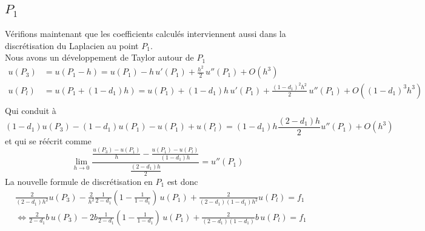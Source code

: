 \documentclass[11pt,a4paper]{article}
\begin{document}
\subsection{$P_1$}
Vérifions maintenant que les coefficients calculés interviennent aussi dans la discrétisation du Laplacien au point $P_1$.\\
Nous avons un développement de Taylor autour de $P_1$
\begin{align*}
u (P_3) &= u \left(P_1-h\right) = u \left(P_1\right) - h\,u'\left(P_1\right) + \frac{h^2}{2}\,u''\left(P_1\right) + O\left(h^3\right)\\
u \left(P_l\right) &= u \left(P_1+(1-d_1)h\right) = u \left(P_1\right) + (1-d_1)h\,u'\left(P_1\right) + \frac{(1-d_1)^2h^2}{2}\,u''(P_1) + O\left((1-d_1)^3h^3\right)\\
\end{align*}
Qui conduit à
\begin{equation}
(1-d_1)u \left(P_3\right) - (1-d_1)u\left(P_1\right) - u\left(P_1\right) +  u (P_l) = (1-d_1)h\frac{(2-d_1)h}{2}u''\left(P_1\right) + O(h^3)
\end{equation}
et qui se réécrit comme
\begin{equation}
\lim_{h\to0}\frac{\frac{u(P_3)- u (P_1)}{h} - \frac{u (P_1) - u (P_l)}{(1-d_1)h}}{\frac{(2-d_1)h}{2}} = u''(P_1)
\end{equation}
La nouvelle formule de discrétisation en $P_1$ est donc
\begin{align*}
& \frac{2}{(2- d_1)h^2}u(P_3) - \frac{2}{h^2}\frac{1}{2-d_1}\left(1 - \frac{1}{1-d_1}\right)\,u(P_1) + \frac{2}{(2-d_1)(1-d_1)h^2}u(P_l) = f_1\\
& \Longleftrightarrow \frac{2}{2-d_1}b\,u(P_3) - 2b\frac{1}{2-d_1}\left(1- \frac{1}{1-d_1}\right)\,u(P_1) + \frac{2}{(2-d_1)(1-d_1)}b\,u(P_l) = f_1
\end{align*}
\end{document}
